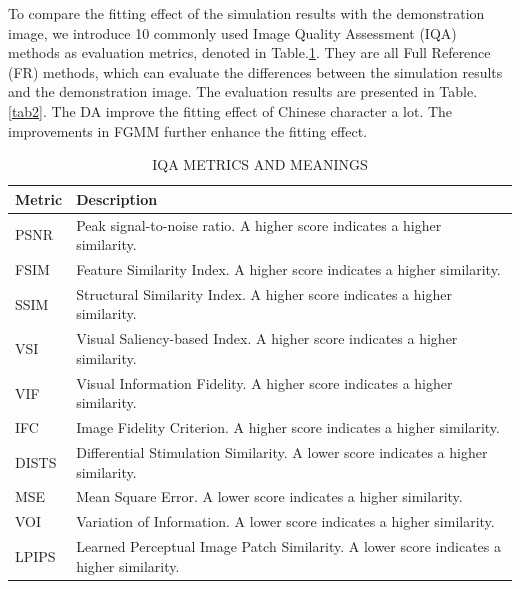 \documentclass[conference]{IEEEtran}
\begin{document}
To compare the fitting effect of the simulation results with the demonstration image, we introduce 10 commonly used Image Quality Assessment (IQA) methods as evaluation metrics, denoted in Table.\ref{tab1}. They are all Full Reference (FR) methods, which can evaluate the differences between the simulation results and the demonstration image. The evaluation results are presented in Table.\ref{tab2}. The DA improve the fitting effect of Chinese character a lot. The improvements in FGMM further enhance the fitting effect.  
\begin{table}[!t]
\centering  
\caption{IQA METRICS AND MEANINGS}
\label{tab1}
\begin{tabularx}{3in}{lX}
\toprule
Metric & Description\\
\midrule
PSNR & Peak signal-to-noise ratio. A higher score indicates a higher similarity.\\
FSIM & Feature Similarity Index. A higher score indicates a higher similarity.\\
SSIM & Structural Similarity Index. A higher score indicates a higher similarity.\\
VSI & Visual Saliency-based Index. A higher score indicates a higher similarity.\\
VIF & Visual Information Fidelity. A higher score indicates a higher similarity.\\ 
IFC & Image Fidelity Criterion. A higher score indicates a higher similarity.\\
DISTS & Differential Stimulation Similarity. A lower score indicates a higher similarity.\\
MSE & Mean Square Error. A lower score indicates a higher similarity.\\
VOI & Variation of Information. A lower score indicates a higher similarity.\\
LPIPS & Learned Perceptual Image Patch Similarity. A lower score indicates a higher similarity.\\
\bottomrule
\end{tabularx}
\end{table}

\end{document}
